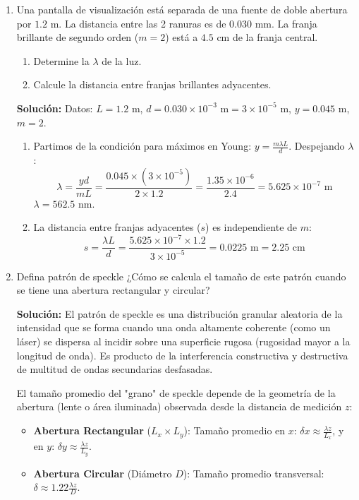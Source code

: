 \documentclass[12pt, letterpaper]{article}
\begin{document}
\begin{enumerate}
		\item Una pantalla de visualización está separada de una fuente de doble abertura por $1.2\text{ m}$. La distancia entre las 2 ranuras es de $0.030\text{ mm}$. La franja brillante de segundo orden ($m=2$) está a $4.5\text{ cm}$ de la franja central.
		\begin{enumerate}
			\item Determine la $\lambda$ de la luz. 
			\item Calcule la distancia entre franjas brillantes adyacentes.
		\end{enumerate}
		
		\textbf{Solución:}
		Datos: $L = 1.2\text{ m}$, $d = 0.030 \times 10^{-3}\text{ m} = 3 \times 10^{-5}\text{ m}$, $y = 0.045\text{ m}$, $m = 2$.
		
		\begin{enumerate}
			\item Partimos de la condición para máximos en Young: $y = \frac{m\lambda L}{d}$.
			Despejando $\lambda$:
			$$ \lambda = \frac{y d}{m L} = \frac{0.045 \times (3 \times 10^{-5})}{2 \times 1.2} = \frac{1.35 \times 10^{-6}}{2.4} = 5.625 \times 10^{-7}\text{ m} $$
			$\lambda = 562.5\text{ nm}$.
			
			\item La distancia entre franjas adyacentes ($s$) es independiente de $m$:
			$$ s = \frac{\lambda L}{d} = \frac{5.625 \times 10^{-7} \times 1.2}{3 \times 10^{-5}} = 0.0225\text{ m} = 2.25\text{ cm} $$
		\end{enumerate}
		
		\item Defina patrón de speckle ¿Cómo se calcula el tamaño de este patrón cuando se tiene una abertura rectangular y circular? 
		
		\textbf{Solución:}
		El patrón de speckle es una distribución granular aleatoria de la intensidad que se forma cuando una onda altamente coherente (como un láser) se dispersa al incidir sobre una superficie rugosa (rugosidad mayor a la longitud de onda). Es producto de la interferencia constructiva y destructiva de multitud de ondas secundarias desfasadas.
		
		El tamaño promedio del "grano" de speckle depende de la geometría de la abertura (lente o área iluminada) observada desde la distancia de medición $z$:
		\begin{itemize}
			\item \textbf{Abertura Rectangular} ($L_x \times L_y$):
			Tamaño promedio en $x$: $\delta x \approx \frac{\lambda z}{L_x}$, y en $y$: $\delta y \approx \frac{\lambda z}{L_y}$.
			\item \textbf{Abertura Circular} (Diámetro $D$):
			Tamaño promedio transversal: $\delta \approx 1.22 \frac{\lambda z}{D}$.
		\end{itemize}
		

\end{enumerate}
\end{document}
